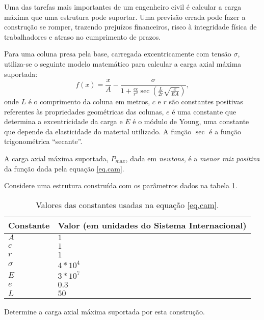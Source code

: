 \begin{ex}\label{prob.coluna}
Uma das tarefas mais importantes de um engenheiro civil é calcular a carga máxima que uma estrutura pode suportar. Uma previsão errada pode fazer a construção se romper, trazendo prejuízos financeiros, risco à integridade física de trabalhadores e atraso no cumprimento de prazos.

Para uma coluna presa pela base, carregada excentricamente com tensão $\sigma$, utiliza-se o seguinte modelo matemático para calcular a carga axial máxima suportada:
\begin{equation}
f(x)=\frac{x}{A}-\frac{\sigma}{1+\frac{e c}{r^2}\sec{\left(\frac{L}{2r}\sqrt{\frac{x}{E A}}\right)}},
\label{eq.cam}
\end{equation}
onde $L$ é o comprimento da coluna em metros, $c$ e $r$ são constantes positivas referentes às propriedades geométricas das colunas, $e$ é uma constante que determina a excentricidade da carga e $E$ é o módulo de Young, uma constante que depende da elasticidade do material utilizado. A função $\sec$ é a função trigonométrica ``secante''.

A carga axial máxima suportada, $P_{max}$, dada em \emph{newtons}, é a \emph{menor raiz positiva} da função dada pela equação \ref{eq.cam}.

Considere uma estrutura construída com os parâmetros dados na tabela \ref{tab.parametros_coluna}.

\begin{table}[hb]
\centering
\caption{Valores das constantes usadas na equação \ref{eq.cam}.}
\label{tab.parametros_coluna}
\begin{tabular}{@{}ll@{}}
\toprule
Constante & Valor (em unidades do Sistema Internacional) \\ \midrule
$A$       & $1$                                            \\
$c$       & $1$                                            \\
$r$       & $1$                                            \\
$\sigma$  & $4*10^4$                                     \\
$E$       & $3*10^7$                                     \\
$e$       & $0.3$                                          \\
$L$       & $50$                                           \\ \bottomrule
\end{tabular}
\end{table}

Determine a carga axial máxima suportada por esta construção.
\end{ex}

